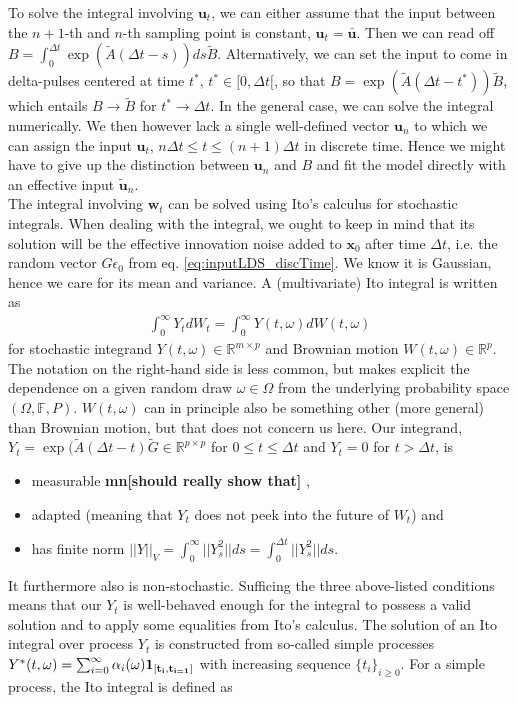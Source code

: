 \documentclass[10pt,letterpaper]{article}
\newcommand{\mn}[1]{   {\bf \color{blue}mn[#1]}  }
\newcommand{\xb}{\mathbf{x}}
\newcommand{\ub}{\mathbf{u}}
\newcommand{\wb}{\mathbf{w}}
\begin{document}
\noindent{}To solve the integral involving $\ub_t$, we can either assume that the input between the $n+1$-th and $n$-th sampling point is constant, $\ub_t = \bar{\ub}$. Then we can read off $B = \int_0^{\Delta{}t} \exp(\tilde{A}(\Delta{}t - s)) ds \tilde{B}$. Alternatively, we can set the input to come in delta-pulses centered at time $t^*$, $t^* \in [0, \Delta{}t[$, so that $B = \exp(\tilde{A}(\Delta{}t-t^*))\tilde{B}$, which entails $B \rightarrow \tilde{B}$ for $t^* \rightarrow \Delta{}t$. In the general case, we can solve the integral numerically. We then however lack a single well-defined vector $\ub_n$ to which we can assign the input $\ub_t$, $n\Delta{}t \leq t \leq (n+1)\Delta{}t$ in discrete time. Hence we might have to give up the distinction between $\ub_n$ and $B$ and fit the model directly with an effective input $\tilde{\ub}_n$. \\
\noindent{}The integral involving $\wb_t$ can be solved using Ito's calculus for stochastic integrals. When dealing with the integral, we ought to keep in mind that its solution will be the effective innovation noise added to $\xb_0$ after time $\Delta{}t$, i.e. the random vector $G\epsilon_0$ from eq. \ref{eq:inputLDS_discTime}. We know it is Gaussian, hence we care for its mean and variance. A (multivariate) Ito integral is written as 
\begin{align}
\int_0^\infty Y_t dW_t = \int_0^\infty Y(t,\omega) dW(t,\omega)
\end{align}
for stochastic integrand $Y(t,\omega) \in \mathbb{R}^{m \times p}$ and Brownian motion $W(t,\omega) \in \mathbb{R}^p$. The notation on the right-hand side is less common, but makes explicit the dependence on a given random draw $\omega \in \Omega$ from the underlying probability space $(\Omega, \mathbb{F}, P)$. $W(t, \omega)$ can in principle also be something other (more general) than Brownian motion, but that does not concern us here. Our integrand, $Y_t = \exp(\tilde{A}(\Delta{}t - t) \tilde{G} \in \mathbb{R}^{p \times p}$ for $0 \leq t \leq \Delta{t}$ and $Y_t = 0$ for $t > \Delta{}t$, is 
\begin{itemize}
\item measurable \mn{should really show that}, 
\item adapted (meaning that $Y_t$ does not peek into the future of $W_t$) and 
\item has finite norm $|| Y ||_V = \int_0^\infty || Y_s^2 || ds = \int_0^{\Delta{}t}|| Y_s^2 || ds$.
\end{itemize} 
It furthermore also is non-stochastic. Sufficing the three above-listed conditions means that our $Y_t$ is well-behaved enough for the integral to possess a valid solution and to apply some equalities from Ito's calculus. The solution of an Ito integral over process $Y_t$ is constructed from so-called simple processes $Y^*(t,\omega) = \sum_{i=0}^\infty \alpha_i(\omega) \bf{1}_{[t_i,t_{i=1}]}$ with increasing sequence $\{t_i\}_{i\geq0}$. For a simple process, the Ito integral is defined as 
\end{document}
